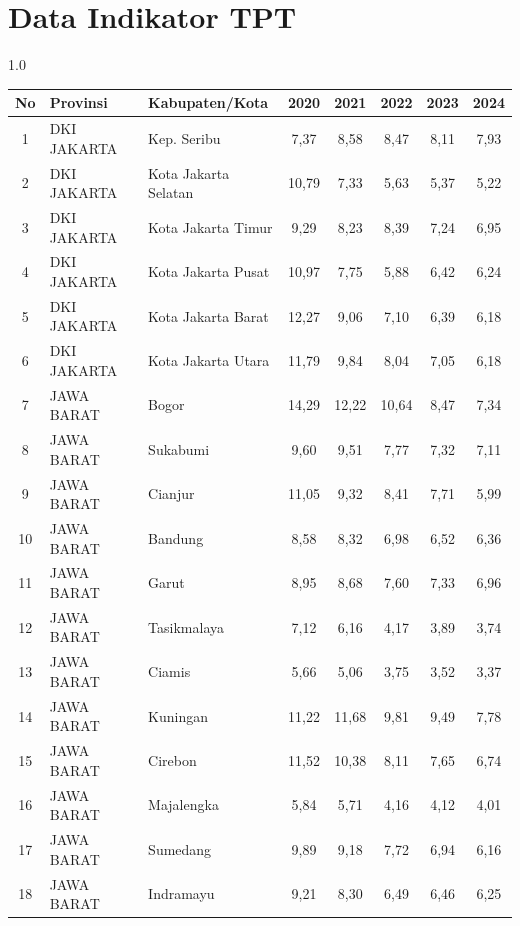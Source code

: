 \section*{Data Indikator TPT}
\begin{spacing}{1.0}
\scriptsize
\setlength{\tabcolsep}{2pt}
\begin{longtable}{|c|p{2.2cm}|p{2.8cm}|c|c|c|c|c|}
\hline
\textbf{No} & \textbf{Provinsi} & \textbf{Kabupaten/Kota} & \textbf{2020} & \textbf{2021} & \textbf{2022} & \textbf{2023} & \textbf{2024} \\ \hline
\endhead
1 & DKI JAKARTA & Kep. Seribu & 7,37 & 8,58 & 8,47 & 8,11 & 7,93 \\ \hline
2 & DKI JAKARTA & Kota Jakarta Selatan & 10,79 & 7,33 & 5,63 & 5,37 & 5,22 \\ \hline
3 & DKI JAKARTA & Kota Jakarta Timur & 9,29 & 8,23 & 8,39 & 7,24 & 6,95 \\ \hline
4 & DKI JAKARTA & Kota Jakarta Pusat & 10,97 & 7,75 & 5,88 & 6,42 & 6,24 \\ \hline
5 & DKI JAKARTA & Kota Jakarta Barat & 12,27 & 9,06 & 7,10 & 6,39 & 6,18 \\ \hline
6 & DKI JAKARTA & Kota Jakarta Utara & 11,79 & 9,84 & 8,04 & 7,05 & 6,18 \\ \hline
7 & JAWA BARAT & Bogor & 14,29 & 12,22 & 10,64 & 8,47 & 7,34 \\ \hline
8 & JAWA BARAT & Sukabumi & 9,60 & 9,51 & 7,77 & 7,32 & 7,11 \\ \hline
9 & JAWA BARAT & Cianjur & 11,05 & 9,32 & 8,41 & 7,71 & 5,99 \\ \hline
10 & JAWA BARAT & Bandung & 8,58 & 8,32 & 6,98 & 6,52 & 6,36 \\ \hline
11 & JAWA BARAT & Garut & 8,95 & 8,68 & 7,60 & 7,33 & 6,96 \\ \hline
12 & JAWA BARAT & Tasikmalaya & 7,12 & 6,16 & 4,17 & 3,89 & 3,74 \\ \hline
13 & JAWA BARAT & Ciamis & 5,66 & 5,06 & 3,75 & 3,52 & 3,37 \\ \hline
14 & JAWA BARAT & Kuningan & 11,22 & 11,68 & 9,81 & 9,49 & 7,78 \\ \hline
15 & JAWA BARAT & Cirebon & 11,52 & 10,38 & 8,11 & 7,65 & 6,74 \\ \hline
16 & JAWA BARAT & Majalengka & 5,84 & 5,71 & 4,16 & 4,12 & 4,01 \\ \hline
17 & JAWA BARAT & Sumedang & 9,89 & 9,18 & 7,72 & 6,94 & 6,16 \\ \hline
18 & JAWA BARAT & Indramayu & 9,21 & 8,30 & 6,49 & 6,46 & 6,25 \\ \hline

\end{longtable}
\end{spacing}
